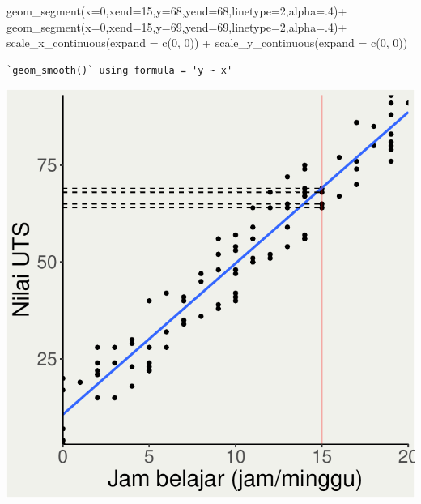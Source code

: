 \documentclass[
  letterpaper,
  DIV=11,
  numbers=noendperiod]{scrartcl}
\newenvironment{Shaded}{\begin{snugshade}}{\end{snugshade}}
\newcommand{\AttributeTok}[1]{\textcolor[rgb]{0.40,0.45,0.13}{#1}}
\newcommand{\DecValTok}[1]{\textcolor[rgb]{0.68,0.00,0.00}{#1}}
\newcommand{\FunctionTok}[1]{\textcolor[rgb]{0.28,0.35,0.67}{#1}}
\newcommand{\NormalTok}[1]{\textcolor[rgb]{0.00,0.23,0.31}{#1}}
\newcommand{\SpecialCharTok}[1]{\textcolor[rgb]{0.37,0.37,0.37}{#1}}
\begin{document}
\begin{Shaded}
\begin{Highlighting}[]
  \FunctionTok{geom\_segment}\NormalTok{(}\AttributeTok{x=}\DecValTok{0}\NormalTok{,}\AttributeTok{xend=}\DecValTok{15}\NormalTok{,}\AttributeTok{y=}\DecValTok{68}\NormalTok{,}\AttributeTok{yend=}\DecValTok{68}\NormalTok{,}\AttributeTok{linetype=}\DecValTok{2}\NormalTok{,}\AttributeTok{alpha=}\NormalTok{.}\DecValTok{4}\NormalTok{)}\SpecialCharTok{+}
  \FunctionTok{geom\_segment}\NormalTok{(}\AttributeTok{x=}\DecValTok{0}\NormalTok{,}\AttributeTok{xend=}\DecValTok{15}\NormalTok{,}\AttributeTok{y=}\DecValTok{69}\NormalTok{,}\AttributeTok{yend=}\DecValTok{69}\NormalTok{,}\AttributeTok{linetype=}\DecValTok{2}\NormalTok{,}\AttributeTok{alpha=}\NormalTok{.}\DecValTok{4}\NormalTok{)}\SpecialCharTok{+}
  \FunctionTok{scale\_x\_continuous}\NormalTok{(}\AttributeTok{expand =} \FunctionTok{c}\NormalTok{(}\DecValTok{0}\NormalTok{, }\DecValTok{0}\NormalTok{)) }\SpecialCharTok{+} \FunctionTok{scale\_y\_continuous}\NormalTok{(}\AttributeTok{expand =} \FunctionTok{c}\NormalTok{(}\DecValTok{0}\NormalTok{, }\DecValTok{0}\NormalTok{))}
\end{Highlighting}
\end{Shaded}

\begin{verbatim}
`geom_smooth()` using formula = 'y ~ x'
\end{verbatim}

\includegraphics{index_files/figure-pdf/unnamed-chunk-22-1.pdf}
\end{document}
